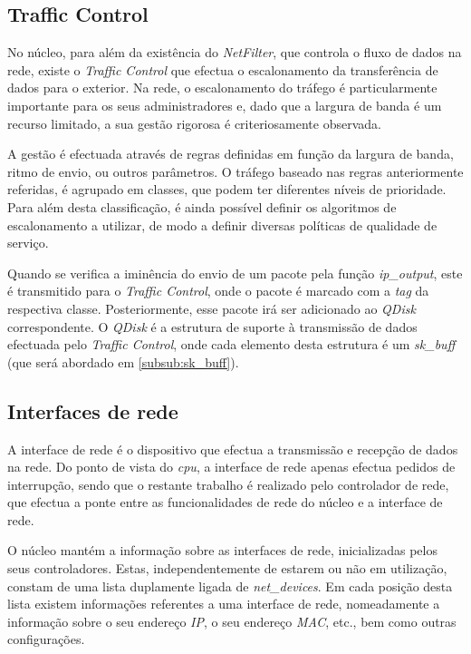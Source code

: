 \subsection{Traffic Control}
\label{sub:traffic_control}

No núcleo, para além da existência do \textit{NetFilter}, que controla o fluxo de dados na rede, existe o \textit{Traffic Control} que efectua o escalonamento da transferência de dados para o exterior.
Na rede, o escalonamento do tráfego é particularmente importante para os seus administradores e, dado que a largura de banda é um recurso limitado, a sua gestão rigorosa é criteriosamente observada.

A gestão é efectuada através de regras definidas em função da largura de banda, ritmo de envio, ou outros parâmetros.
O tráfego baseado nas regras anteriormente referidas, é agrupado em classes, que podem ter diferentes níveis de prioridade.
Para além desta classificação, é ainda possível definir os algoritmos de escalonamento a utilizar, de modo a definir diversas políticas de qualidade de serviço.

Quando se verifica a iminência do envio de um pacote pela função \textit{ip\_output}, este é transmitido para o \textit{Traffic Control}, onde o pacote é marcado com a \textit{tag} da respectiva classe.
Posteriormente, esse pacote irá ser adicionado ao \textit{QDisk} correspondente.
O \textit{QDisk} é a estrutura de suporte à transmissão de dados efectuada pelo \textit{Traffic Control}, onde cada elemento desta estrutura é um \textit{sk\_buff} (que será abordado em \ref{subsub:sk_buff}).


\subsection{Interfaces de rede}

A interface de rede é o dispositivo que efectua a transmissão e recepção de dados na rede.
Do ponto de vista do \textit{cpu}, a interface de rede apenas efectua pedidos de interrupção, sendo que o restante trabalho é realizado pelo controlador de rede, que efectua a ponte entre as funcionalidades de rede do núcleo e a interface de rede.

O núcleo mantém a informação sobre as interfaces de rede, inicializadas pelos seus controladores.
Estas, independentemente de estarem ou não em utilização, constam de uma lista duplamente ligada de \textit{net\_devices}.
Em cada posição desta lista existem informações referentes a uma interface de rede, nomeadamente a informação sobre o seu endereço \textit{IP}, o seu endereço \textit{MAC}, etc., bem como outras configurações.

